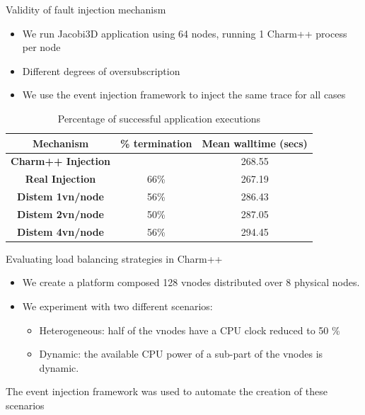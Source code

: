 \documentclass[11pt,xcolor=dvipsnames,presentation]{beamer}
\begin{document}
\begin{frame}[label=sec-3-0-3]{Validity of fault injection mechanism}
\begin{itemize}
\item We run Jacobi3D application using 64 nodes, running 1 Charm++ process per node

\item Different degrees of oversubscription

\item We use the event injection framework to inject the same trace for all cases
\end{itemize}

\begin{table}[ht!]
        \center
  {\scriptsize
  \begin{tabular}{|c|c|c|}
  \hline
    \textbf{Mechanism}  &  \textbf{ \% termination} & \textbf{ Mean walltime
    (secs)} \\
  \hline
  \textbf{Charm++ Injection}  &  \color{red}{100\%} & 268.55\\
  \textbf{Real Injection}  &  66\% & 267.19\\
  \textbf{Distem 1vn/node}  &  56\% & 286.43\\
  \textbf{Distem 2vn/node}  &  50\% & 287.05\\
  \textbf{Distem 4vn/node}  &  56\% & 294.45\\
  \hline
  \end{tabular}
  }
  \caption{Percentage of successful application executions}
  \label{table:FT_validation}
\end{table}
\end{frame}

\begin{frame}[label=sec-3-0-4]{Evaluating load balancing strategies in Charm++}
\begin{itemize}
\item We create a platform composed 128 vnodes distributed over 8 physical nodes.

\item We experiment with two different scenarios:

\begin{itemize}
\item \alert{Heterogeneous}: half of the vnodes have a CPU clock reduced to 50 \%

\item \alert{Dynamic}: the available CPU power of a sub-part of the vnodes is dynamic.
\end{itemize}
\end{itemize}


The event injection framework was used to automate the creation of these scenarios
\end{frame}
\end{document}
